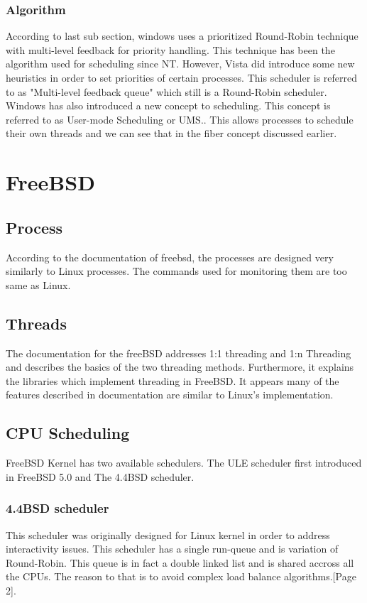 \documentclass[journal,10pt,onecolumn,compsoc,letterpaper,draftclsnofoot,table,xcdraw]{IEEEtran} \usepackage[margin=0.75in]{geometry}
\begin{document}
\subsubsection{Algorithm}
\noindent According to last sub section, windows uses a prioritized Round-Robin technique with multi-level feedback for priority handling. This technique has been the algorithm used for scheduling since NT. However, Vista did introduce some new heuristics in order to set priorities of certain processes. This scheduler is referred to as "Multi-level feedback queue" which still is a Round-Robin scheduler. Windows has also introduced a new concept to scheduling. This concept is referred to as User-mode Scheduling or UMS.\cite{windowscpuscheduling}. This allows processes to schedule their own threads and we can see that in the fiber concept discussed earlier.
\section{FreeBSD}
\subsection{Process}
\noindent According to the documentation of freebsd, the processes are designed very similarly to Linux processes. The commands used for monitoring them are too same as Linux.\cite{freebsdPD} 
\subsection{Threads}
\noindent  The documentation for the freeBSD addresses 1:1 threading and 1:n Threading and describes the basics of the two threading methods. \cite{freebsdalook} Furthermore, it explains the libraries which implement threading in FreeBSD. It appears many of the features described in documentation are similar to Linux's implementation.
\subsection{CPU Scheduling}
\noindent FreeBSD Kernel has two available schedulers. The ULE scheduler first introduced in FreeBSD 5.0 and The 4.4BSD scheduler.
\subsubsection{4.4BSD scheduler}
\noindent This scheduler was originally designed for Linux kernel in order to address interactivity issues. This scheduler has a single run-queue and is variation of Round-Robin. This queue is in fact a double linked list and is shared accross all the CPUs. The reason to that is to avoid complex load balance algorithms.\cite{freebsdpdf}[Page 2].
\end{document}
